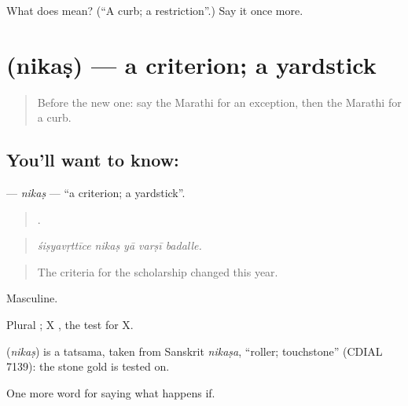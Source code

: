 \begin{tcolorbox}[breakable,colback=teal!4,colframe=teal!35!black,title={Before you move on}]
What does  mean? (\textquotedblleft{}A curb; a restriction\textquotedblright{}.) Say it once more.
\end{tcolorbox}
\section[\texorpdfstring{\mr{निकष} (nikaṣ)}{निकष (nikaṣ)}]{ (nikaṣ) — a criterion; a yardstick}

\label{lesson:MR-C378-nikas}



\begin{quote}
Before the new one: say the Marathi for an exception, then the Marathi for a curb.
\end{quote}

\subsection*{You'll want to know: }
\textbf{} — \emph{nikaṣ} — \textquotedblleft{}a criterion; a yardstick\textquotedblright{}.

\begin{quote}
    .
\end{quote}

\begin{quote}
\emph{śiṣyavṛttīce nikaṣ yā varṣī badalle.}
\end{quote}

\begin{quote}
The criteria for the scholarship changed this year.
\end{quote}

Masculine.

Plural ; X  , the test for X.

\begin{cousinweb}
\textbf{} (\emph{nikaṣ}) is a tatsama, taken from Sanskrit \emph{nikaṣa}, \textquotedblleft{}roller; touchstone\textquotedblright{} (CDIAL 7139): the stone gold is tested on.
\end{cousinweb}

\begin{grammarlens}[title={What you've built}]
One more word for saying what happens if.
\end{grammarlens}


